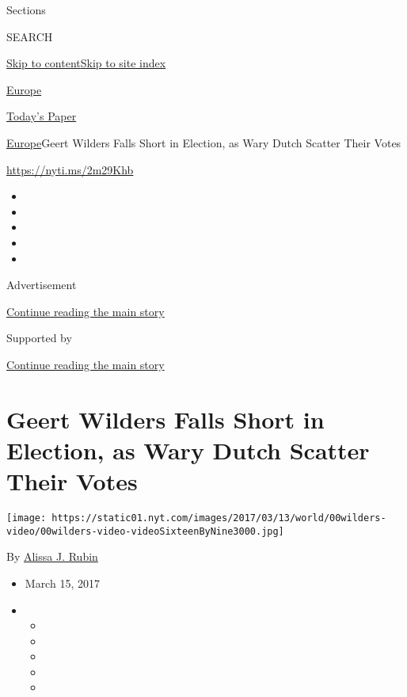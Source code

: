 Sections

SEARCH

\protect\hyperlink{site-content}{Skip to
content}\protect\hyperlink{site-index}{Skip to site index}

\href{https://www.nytimes.com/section/world/europe}{Europe}

\href{https://myaccount.nytimes.com/auth/login?response_type=cookie\&client_id=vi}{}

\href{https://www.nytimes.com/section/todayspaper}{Today's Paper}

\href{/section/world/europe}{Europe}\textbar{}Geert Wilders Falls Short
in Election, as Wary Dutch Scatter Their Votes

\url{https://nyti.ms/2m29Khb}

\begin{itemize}
\item
\item
\item
\item
\item
\end{itemize}

Advertisement

\protect\hyperlink{after-top}{Continue reading the main story}

Supported by

\protect\hyperlink{after-sponsor}{Continue reading the main story}

\hypertarget{geert-wilders-falls-short-in-election-as-wary-dutch-scatter-their-votes}{%
\section{Geert Wilders Falls Short in Election, as Wary Dutch Scatter
Their
Votes}\label{geert-wilders-falls-short-in-election-as-wary-dutch-scatter-their-votes}}

\texttt{[image: https://static01.nyt.com/images/2017/03/13/world/00wilders-video/00wilders-video-videoSixteenByNine3000.jpg]}

By \href{https://www.nytimes.com/by/alissa-j-rubin}{Alissa J. Rubin}

\begin{itemize}
\item
  March 15, 2017
\item
  \begin{itemize}
  \item
  \item
  \item
  \item
  \item
  \end{itemize}
\end{itemize}

